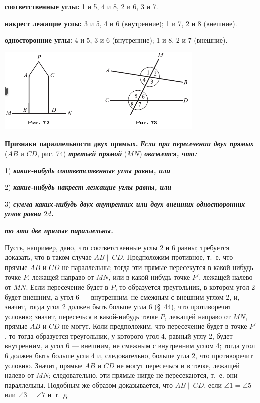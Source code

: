 \documentclass[oneside]{book}
\begin{document}
\textbf{соответственные углы:}
1 и 5, 4 и 8, 2 и 6, 3 и 7.

\textbf{накрест лежащие углы:}
3 и 5, 4 и 6 (внутренние);
1 и 7, 2 и 8 (внешние).

\textbf{односторонние углы:}
4 и 5, 3 и 6 (внутренние);
1 и 8, 2 и 7 (внешние).

\includegraphics{pics/ris-72-73}

\textbf{Признаки параллельности двух прямых.}
\textbf{\emph{Если при пересечении двух прямых}} ($AB$ и $CD$, рис. 74) \textbf{\emph{третьей прямой}} ($MN$) \textbf{\emph{окажется, что:}}

1) \textbf{\emph{какие-нибудь соответственные углы равны, или}}

2) \textbf{\emph{какие-нибудь накрест лежащие углы равны, или}}

3) \textbf{\emph{сумма каких-нибудь двух внутренних или двух внешних односторонних углов равна $2d$.}}

\noindent\textbf{\emph{то эти две прямые параллельны.}}


Пусть, например, дано, что соответственные углы 2 и 6 равны;
требуется доказать, что в таком случае $AB \parallel CD$.
Предположим противное, т.~е. что прямые $AB$ и $CD$ не параллельны;
тогда эти прямые пересекутся в какой-нибудь точке $P$, лежащей направо от $MN$, или в какой-нибудь точке $P'$, лежащей налево от $MN$.
Если пересечение будет в $P$, то образуется треугольник, в котором угол 2 будет внешним, а угол 6 — внутренним, не смежным с внешним углом 2, и, значит, тогда угол 2 должен быть больше угла 6 (§~44), что противоречит условию;
значит, пересечься в какой-нибудь точке $P$, лежащей направо от $MN$, прямые $AB$ и $CD$ не могут.
Коли предположим, что пересечение будет в точке $P'$, то тогда образуется треугольник, у которого угол 4, равный углу 2, будет внутренним, а угол 6 — внешним, не смежным с внутренним углом 4;
тогда угол 6 должен быть больше угла 4 и, следовательно, больше угла 2, что противоречит условию.
Значит, прямые $AB$ и $CD$ не могут пересечься и в точке, лежащей налево от $MN$;
следовательно, эти прямые нигде не пересекаются, т.~е. они параллельны.
Подобным же образом доказывается, что $AB \parallel CD$, если $\angle 1 = \angle 5$ или $\angle 3 = \angle 7$ и~т.~д.
\end{document}
